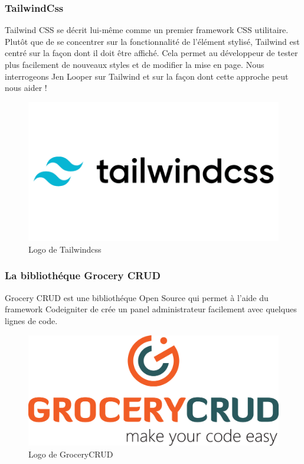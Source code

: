 \documentclass[french]{report}
\begin{document}
\subsubsection{TailwindCss}

Tailwind CSS se décrit lui-même comme un premier framework CSS utilitaire.
Plutôt que de se concentrer sur la fonctionnalité de l'élément stylisé, Tailwind
est centré sur la façon dont il doit être affiché. Cela permet au développeur de
tester plus facilement de nouveaux styles et de modifier la mise en page. Nous
interrogeons Jen Looper sur Tailwind et sur la façon dont cette approche peut
nous aider !

\begin{figure}[H]
    \centering
    \includegraphics[width=1\textwidth]{images/tailwind-css-logo-vector.png}
    \caption{Logo de Tailwindcss}
    \label{fig:my_label}
\end{figure}

\subsubsection{La bibliothéque Grocery CRUD}

Grocery CRUD est une bibliothéque Open Source qui permet à l'aide du framework
Codeigniter de crée un panel administrateur facilement avec quelques lignes de
code.

\begin{figure}[H]
    \centering
    \includegraphics[width=1\textwidth]{images/logo-big.png}
    \caption{Logo de GroceryCRUD}
    \label{fig:my_label}
\end{figure}
\end{document}
